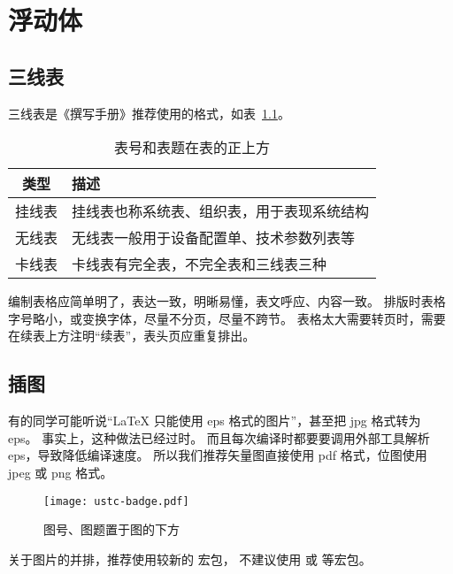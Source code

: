
\chapter{浮动体}

\section{三线表}

三线表是《撰写手册》推荐使用的格式，如表~\ref{tab:exampletable}。
\begin{table}[h]
  \centering
  \caption{表号和表题在表的正上方}
  \label{tab:exampletable}
  \begin{tabular}{cl}
    \toprule
    类型   & 描述                                       \\
    \midrule
    挂线表 & 挂线表也称系统表、组织表，用于表现系统结构 \\
    无线表 & 无线表一般用于设备配置单、技术参数列表等   \\
    卡线表 & 卡线表有完全表，不完全表和三线表三种       \\
    \bottomrule
  \end{tabular}
\end{table}

编制表格应简单明了，表达一致，明晰易懂，表文呼应、内容一致。
排版时表格字号略小，或变换字体，尽量不分页，尽量不跨节。
表格太大需要转页时，需要在续表上方注明“续表”，表头页应重复排出。

\section{插图}

有的同学可能听说“\LaTeX{} 只能使用 eps 格式的图片”，甚至把 jpg 格式转为 eps。
事实上，这种做法已经过时。
而且每次编译时都要要调用外部工具解析 eps，导致降低编译速度。
所以我们推荐矢量图直接使用 pdf 格式，位图使用 jpeg 或 png 格式。
\begin{figure}[h]
  \centering
  \texttt{[image: ustc-badge.pdf]}
  \caption{图号、图题置于图的下方}
  \label{fig:badge}
\end{figure}

关于图片的并排，推荐使用较新的  宏包，
不建议使用  或  等宏包。



